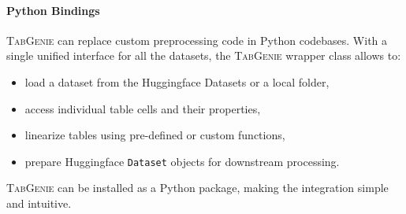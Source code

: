 \paragraph{Python Bindings} \textsc{TabGenie} can replace custom preprocessing code in Python codebases. With a single unified interface for all the datasets, the \textsc{TabGenie} wrapper class allows to:
\begin{itemize}
    \item load a dataset from the Huggingface Datasets or a local folder,
    \item access individual table cells and their properties,
    \item linearize tables using pre-defined or custom functions,
    \item prepare Huggingface \texttt{Dataset} objects for downstream processing.
\end{itemize}
\textsc{TabGenie} can be installed as a Python package, making the integration simple and intuitive.

